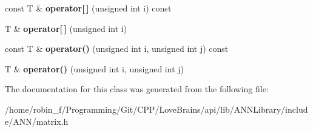 \begin{DoxyCompactItemize}
\item 
\hypertarget{class_g_a_n_n_1_1_matrix_add9f200cb6a2e53709090621e3a1150a}{}const T \& {\bfseries operator\mbox{[}$\,$\mbox{]}} (unsigned int i) const \label{class_g_a_n_n_1_1_matrix_add9f200cb6a2e53709090621e3a1150a}

\item 
\hypertarget{class_g_a_n_n_1_1_matrix_a700ad2c1e9ab4fd76fe1cb18092a80f1}{}T \& {\bfseries operator\mbox{[}$\,$\mbox{]}} (unsigned int i)\label{class_g_a_n_n_1_1_matrix_a700ad2c1e9ab4fd76fe1cb18092a80f1}

\item 
\hypertarget{class_g_a_n_n_1_1_matrix_aa3bef5292a718f45e094926602ff65ca}{}const T \& {\bfseries operator()} (unsigned int i, unsigned int j) const \label{class_g_a_n_n_1_1_matrix_aa3bef5292a718f45e094926602ff65ca}

\item 
\hypertarget{class_g_a_n_n_1_1_matrix_ac3f7f2d7467ba5bc95fca1890be74a38}{}T \& {\bfseries operator()} (unsigned int i, unsigned int j)\label{class_g_a_n_n_1_1_matrix_ac3f7f2d7467ba5bc95fca1890be74a38}

\end{DoxyCompactItemize}


The documentation for this class was generated from the following file\+:\begin{DoxyCompactItemize}
\item 
/home/robin\+\_\+f/\+Programming/\+Git/\+C\+P\+P/\+Love\+Brains/api/lib/\+A\+N\+N\+Library/include/\+A\+N\+N/matrix.\+h\end{DoxyCompactItemize}
